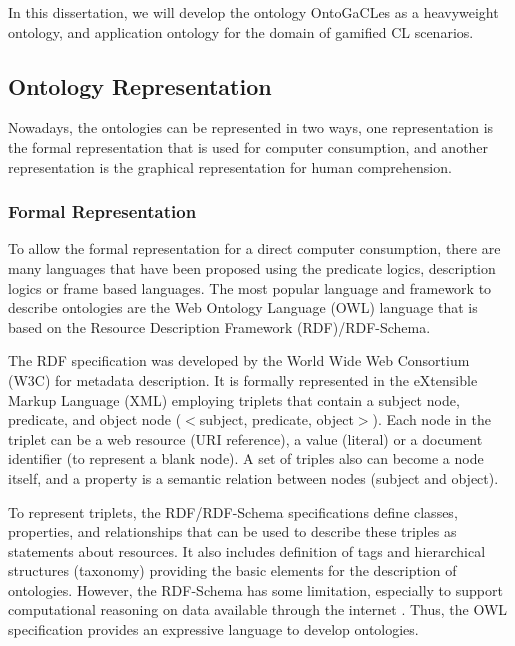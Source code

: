 In this dissertation, we will develop the ontology OntoGaCLes as a heavyweight ontology, and application ontology for the domain of gamified CL scenarios.

\subsection{Ontology Representation}
\label{subsec:ontology-representation}

Nowadays, the ontologies can be represented in two ways, one representation is the formal representation that is used for computer consumption, and another representation is the graphical representation for human comprehension.

\subsubsection{Formal Representation}
\label{subsubsec:formal-representation}

To allow the formal representation for a direct computer consumption, there are many languages that have been proposed using the predicate logics, description logics or frame based languages.
The most popular language and framework to describe ontologies are the Web Ontology Language (OWL) language that is based on the Resource Description Framework (RDF)/RDF-Schema.

The RDF specification was developed by the World Wide Web Consortium (W3C) for metadata description.
It is formally represented in the eXtensible Markup Language (XML) employing triplets that contain a subject node, predicate, and object node ($<$subject, predicate, object$>$).
Each node in the triplet can be a web resource (URI reference), a value (literal) or a document identifier (to represent a blank node).
A set of triples also can become a node itself, and a property is a semantic relation between nodes (subject and object).

To represent triplets, the RDF/RDF-Schema specifications define classes, properties, and relationships that can be used to describe these triples as statements about resources.
It also includes definition of tags and hierarchical structures (taxonomy) providing the basic elements for the description of ontologies. 
However, the RDF-Schema has some limitation, especially to support computational reasoning on data available through the internet \cite{Patel-Schneider2005}.
Thus, the OWL specification provides an expressive language to develop ontologies.

